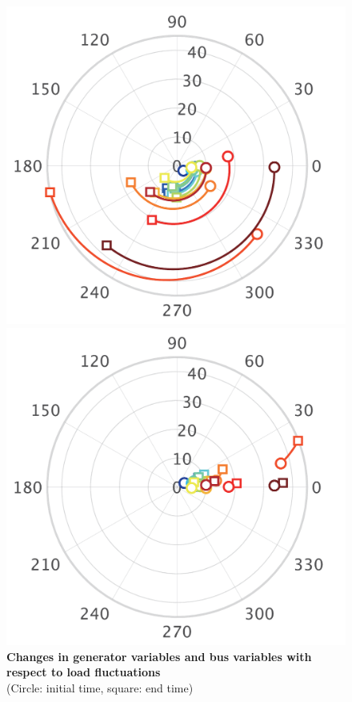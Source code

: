 \documentclass[tombow,dvipdfmx]{corona-a5-1.1}
\begin{document}
\begin{figure}[t!]
{\begin{minipage}{0.49\linewidth}
  \end{minipage}
 \begin{minipage}{0.49\linewidth}
    \centering
    \includegraphics[width = 0.9\linewidth]{figs/Ipolar}
    \medskip
  \end{minipage}
  \begin{minipage}{0.49\linewidth}
    \centering
    \includegraphics[width = 0.9\linewidth]{figs/PQpolar}
    \medskip
  \end{minipage}
  }
  \medskip
  \caption{\textbf{Changes in generator variables and bus variables with respect to load fluctuations}
  \\  \centering(Circle: initial time, square: end time)}
  \label{fig:polars}
\medskip
\end{figure}
\end{document}
